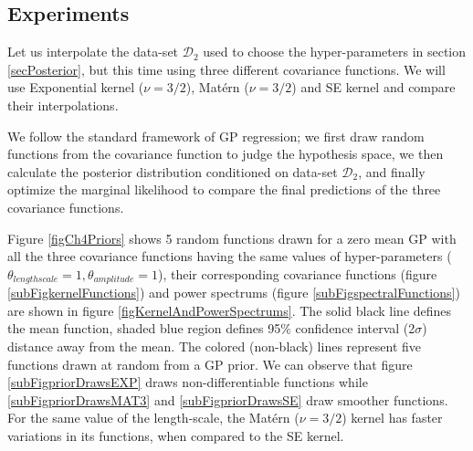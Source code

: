\subsection{Experiments}\label{subsecCH4Experiments}
\begin{mdframed}[hidealllines=true,backgroundcolor=lightgray!20]
Let us interpolate the data-set $\mathcal{D}_{2}$ used to choose the hyper-parameters in section \ref{secPosterior}, but this time using three different covariance functions. We will use Exponential kernel ($\nu=3/2$), Mat\'ern ($\nu=3/2$) and SE kernel and compare their interpolations. 

We follow the standard framework of GP regression; we first draw random functions from the covariance function to judge the hypothesis space, we then calculate the posterior distribution conditioned on data-set $\mathcal{D}_{2}$, and finally optimize the marginal likelihood to compare the final predictions of the three covariance functions. 

Figure \ref{figCh4Priors} shows 5 random functions drawn for a zero mean GP with all the three covariance functions having the same values of hyper-parameters ($\theta_{lengthscale} = 1, \theta_{amplitude} = 1$), their corresponding covariance functions (figure \ref{subFigkernelFunctions}) and power spectrums (figure \ref{subFigspectralFunctions}) are shown in figure \ref{figKernelAndPowerSpectrums}. The solid black line defines the mean function, shaded blue region defines 95\% confidence interval (2$\sigma$) distance away from the mean. The colored (non-black) lines represent five functions drawn at random from a GP prior. We can observe that figure \ref{subFigpriorDrawsEXP} draws non-differentiable functions while \ref{subFigpriorDrawsMAT3} and \ref{subFigpriorDrawsSE} draw smoother functions. For the same value of the length-scale, the Mat\'ern ($\nu=3/2$) kernel has faster variations in its functions, when compared to the SE kernel.
\end{mdframed}

